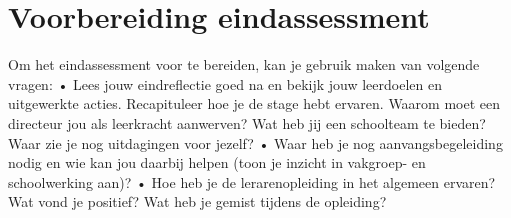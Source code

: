 \documentclass[a4paper,12pt,twoside]{article}%
\begin{document}
	
	
	\section{Voorbereiding eindassessment}
	
	Om het eindassessment voor te bereiden, kan je gebruik maken van volgende vragen:
	• Lees jouw eindreflectie goed na en bekijk jouw leerdoelen en uitgewerkte acties. Recapituleer hoe je de stage hebt ervaren. Waarom moet een directeur jou als leerkracht aanwerven? Wat heb jij een schoolteam te bieden? Waar zie je nog uitdagingen voor jezelf? 
	• Waar heb je nog aanvangsbegeleiding nodig en wie kan jou daarbij helpen (toon je inzicht in vakgroep- en schoolwerking aan)?
	• Hoe heb je de lerarenopleiding in het algemeen ervaren? Wat vond je positief? Wat heb je gemist tijdens de opleiding? 
	
	
	
	
	
	
\end{document}
